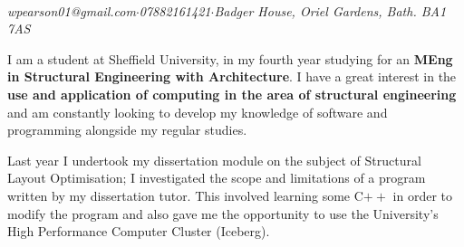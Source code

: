 \documentclass[oneside,a4paper]{article}
\begin{document}
\immediate{}


\\

\noindent \textit{wpearson01@gmail.com\hspace{5mm}$\cdot$\hspace{5mm}07882161421\hspace{5mm}$\cdot$\hspace{5mm}Badger House, Oriel Gardens, Bath. BA1 7AS}

\small
\vspace{0.8cm}
%

\vspace{0.4cm}

I am a student at Sheffield University, in my fourth year studying for an {\bf MEng in Structural Engineering with Architecture}. I have a great interest in the {\bf use and application of computing in the area of structural engineering} and am constantly looking to develop my knowledge of software and programming alongside my regular studies.

Last year I undertook my dissertation module on the subject of Structural Layout Optimisation; I investigated the scope and limitations of a program written by my dissertation tutor. This involved learning some C$++$ in order to modify the program and also gave me the opportunity to use the University's High Performance Computer Cluster (Iceberg).
\end{document}
